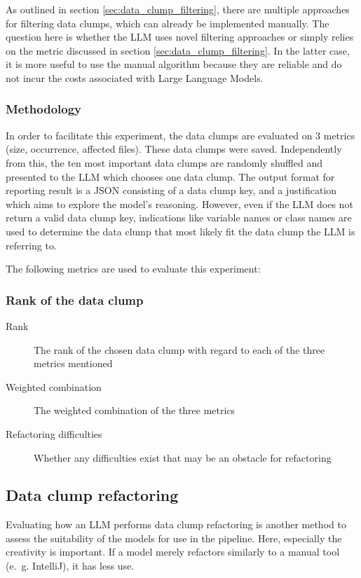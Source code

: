 As outlined in section \ref{sec:data_clump_filtering}, there are multiple approaches for filtering data clumps, which can already be implemented manually. 
The question here is whether the \ac{LLM} uses novel filtering approaches or simply relies on the metric discussed in section \ref{sec:data_clump_filtering}. In the latter case, it is more useful to use the manual algorithm because they are reliable and do not incur the costs associated with Large Language Models. 

\subsubsection{Methodology}
In order to facilitate this experiment, the data clumps are evaluated on 3 metrics (size, occurrence, affected files). These data clumps were saved. Independently from this, the ten most important data clumps are randomly shuffled and presented to the \ac{LLM} which chooses one data clump. The output format for reporting result is a \ac{JSON}  consisting of a data clump key, and a justification which aims to explore the model's reasoning. However, even if the \ac{LLM} does not return a valid data clump key, indications like variable names or class names are used to determine the data clump that most likely fit the data clump the \ac{LLM} is referring to. 

The following metrics are used to evaluate this experiment:
\subsubsection{Rank of the data clump}
\begin{description}
    
    \item [Rank] The rank of the chosen data clump with regard to each of the three metrics mentioned
    \item [Weighted combination] The weighted combination of the three metrics
    \item [Refactoring difficulties] Whether any difficulties exist that may be an obstacle for refactoring
\end{description}


\subsection{Data clump refactoring}

Evaluating how an \ac{LLM} performs data clump refactoring is another method to assess the suitability of the models for use in the pipeline. Here, especially the creativity is important. If a model merely refactors similarly to a manual tool (e.~g. IntelliJ), it has less use.

